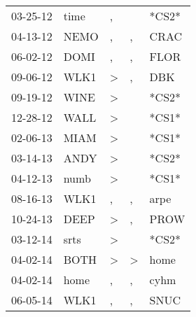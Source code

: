 \begin{supertabular}{p{0.07\textwidth}p{0.06\textwidth}p{0.02\textwidth}p{0.02\textwidth}p{0.06\textwidth}}
          03-25-12\textsuperscript{} &  time\textsuperscript{} &                , &               &                            *CS2* \\
          04-13-12\textsuperscript{} &  NEMO\textsuperscript{} &                , &             , &           CRAC\textsuperscript{} \\
          06-02-12\textsuperscript{} &  DOMI\textsuperscript{} &                , &             , &           FLOR\textsuperscript{} \\
          09-06-12\textsuperscript{} &  WLK1\textsuperscript{} &     \textgreater &             , &            DBK\textsuperscript{} \\
          09-19-12\textsuperscript{} &  WINE\textsuperscript{} &     \textgreater &               &                            *CS2* \\
          12-28-12\textsuperscript{} &  WALL\textsuperscript{} &     \textgreater &               &                            *CS1* \\
          02-06-13\textsuperscript{} &  MIAM\textsuperscript{} &     \textgreater &               &                            *CS1* \\
          03-14-13\textsuperscript{} &  ANDY\textsuperscript{} &     \textgreater &               &                            *CS2* \\
          04-12-13\textsuperscript{} &  numb\textsuperscript{} &     \textgreater &               &                            *CS1* \\
          08-16-13\textsuperscript{} &  WLK1\textsuperscript{} &                , &             , &           arpe\textsuperscript{} \\
          10-24-13\textsuperscript{} &  DEEP\textsuperscript{} &     \textgreater &             , &           PROW\textsuperscript{} \\
          03-12-14\textsuperscript{} &  srts\textsuperscript{} &     \textgreater &               &                            *CS2* \\
          04-02-14\textsuperscript{} &  BOTH\textsuperscript{} &     \textgreater &  \textgreater &           home\textsuperscript{} \\
          04-02-14\textsuperscript{} &  home\textsuperscript{} &                , &             , &           cyhm\textsuperscript{} \\
          06-05-14\textsuperscript{} &  WLK1\textsuperscript{} &                , &             , &           SNUC\textsuperscript{} \\

\end{supertabular}
